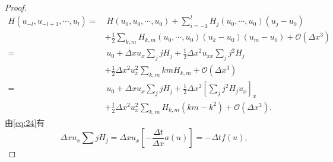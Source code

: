 \documentclass[12pt]{article}
\begin{document}
\begin{proof}
\begin{equation}
	\begin{aligned}
		H\left(u_{-l}, u_{-l+1}, \cdots, u_{l}\right)=&\ H\left(u_0, u_0, \cdots, u_0\right)+\sum_{i=-1}^{l} H_{j}\left(u_{0}, \cdots, u_{0}\right)\left(u_{j}-u_{0}\right) \\
		&+\frac{1}{2} \sum_{k, m} H_{k, m}\left(u_{0}, \cdots, u_{0}\right)\left(u_{k}-u_{0}\right)\left(u_{m}-u_{0}\right)+\mathcal{O}\left(\Delta x^{3}\right) \\
		=&\ u_{0}+\Delta x u_{x} \sum_{j} j H_{j}+\frac{1}{2} \Delta x^{2} u_{x x} \sum_{j} j^{2} H_{j} \\
		&+\frac{1}{2} \Delta x^{2} u_{x}^{2} \sum_{k, m} k m H_{k, m}+\mathcal{O}\left(\Delta x^{3}\right) \\
		=&\ u_{0} +\Delta x u_{x} \sum_{j} j H_{j}+\frac{1}{2} \Delta x^{2}\left[\sum_{j} j^{2} H_{j} u_{x}\right]_{x} \\
		&+\frac{1}{2} \Delta x^{2} u_{x}^{2} \sum_{k, m} H_{k, m}(k m-k^{2})+\mathcal{O}\left(\Delta x^{3}\right).
		\end{aligned}
\end{equation}
由\cref{eq:24}有
\begin{equation}
	\Delta x u_{x} \sum j H_{j}=\Delta x u_{x}\left[-\frac{\Delta t}{\Delta x} a(u)\right]=-\Delta tf(u),
\end{equation}


\end{proof}
\end{document}
